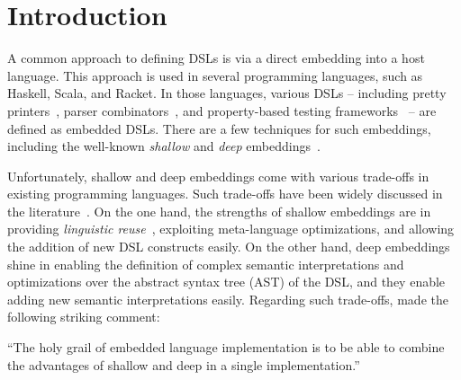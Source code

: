 \section{Introduction}

A common approach to defining DSLs is via a direct embedding into a host
language. This approach is used in several programming languages, such as
Haskell, Scala, and Racket. In those languages, various DSLs -- including pretty
printers~\citep{hughes1995design,wadler2003prettier}, parser
combinators~\citep{leijen2001parsec}, and property-based testing
frameworks~\citep{claessen2000quickcheck} -- are defined as embedded DSLs. There
are a few techniques for such embeddings, including the well-known
\emph{shallow} and \emph{deep} embeddings~\citep{boulton1992experience}.

Unfortunately, shallow and deep embeddings come with various trade-offs in
existing programming languages. Such trade-offs have been widely discussed in
the literature~\citep{rompf2012scala,scherr2014implicit,gibbons2014folding}. On
the one hand, the strengths of shallow embeddings are in providing
\emph{linguistic reuse}~\citep{krishnamurthi2001linguistic}, exploiting
meta-language optimizations, and allowing the addition of new DSL constructs
easily. On the other hand, deep embeddings shine in enabling the definition of
complex semantic interpretations and optimizations over the abstract syntax tree
(AST) of the DSL, and they enable adding new semantic interpretations easily.
Regarding such trade-offs, \citet{svenningsson2015combining} made the following
striking comment:

\begin{quoting}
\noindent ``The holy grail of embedded language implementation is to be able to
combine the advantages of shallow and deep in a single implementation.''
\end{quoting}

